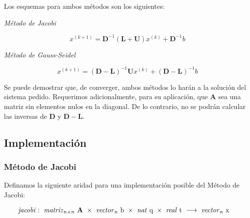 \vspace{1em}
\noindent Los esquemas para ambos métodos son los siguientes:

\vspace{1em}
\begin{center}
    \textit{Método de Jacobi}
\end{center}

\begin{equation} \label{jacobi}
    x^{(k+1)} = \textbf{D}^{-1} (\textbf{L} + \textbf{U}) x^{(k)} + \textbf{D}^{-1} b 
\end{equation}

\vspace{2em}
\begin{center}
    \textit{Método de Gauss-Seidel}
\end{center}

\begin{equation}\label{gauss-seidel}
    x^{(k+1)} = (\mathbf{D} - \mathbf{L})^{-1} \mathbf{U} x^{(k)} + (\mathbf{D} - \mathbf{L})^{-1} b
\end{equation}

\vspace{1em}
Se puede demostrar que, de converger, ambos métodos lo harán a la solución del sistema pedido. Requerimos adicionalmente, para su aplicación, que $\mathbf{A}$ sea una matriz sin elementos nulos en la diagonal. De lo contrario, no se podrán calcular las inversas de $\mathbf{D}$ y $\mathbf{D} - \mathbf{L}$.






\vspace{2em}
\subsection{Implementación}

\vspace{2em}
\subsubsection{Método de Jacobi}
Definamos la siguiente aridad para una implementación posible del Método de Jacobi:

\begin{align*}
    \text{\textit{jacobi}}&:\ \text{\textit{matriz}}_{n \times n}\ \mathbf{A}\ \times\ \text{\textit{vector}}_n\ \text{b}\ \times\ \text{\textit{nat} q}\ \times\ \text{\textit{real} t}\
    \longrightarrow\ \text{\textit{vector}}_n\ \text{x}
\end{align*}

